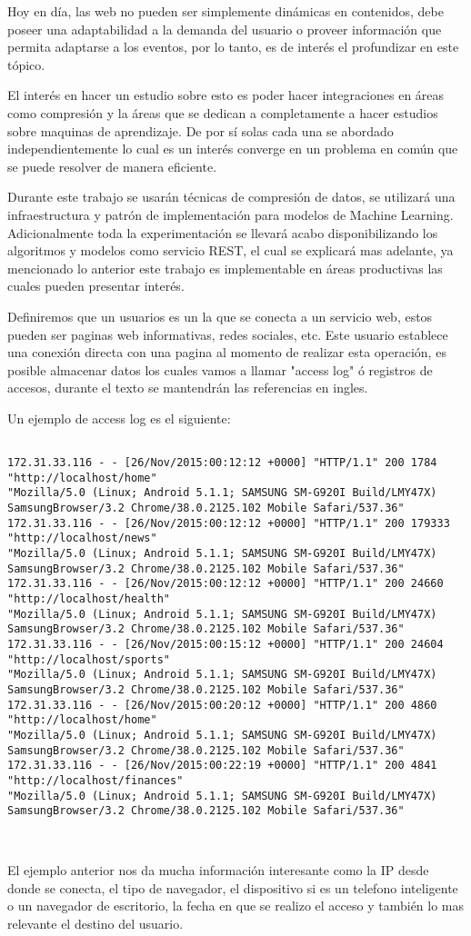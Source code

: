  Hoy en día, las web no pueden ser simplemente dinámicas en contenidos, debe poseer una adaptabilidad a la demanda del usuario o proveer información que permita adaptarse a los eventos, por lo tanto, es de interés el profundizar en este tópico.

  El interés en hacer un estudio sobre esto es poder hacer integraciones en áreas como compresión y la áreas que se dedican a completamente a hacer estudios sobre maquinas de aprendizaje. De por sí solas cada una se abordado independientemente lo cual es un interés converge en un problema en común que se puede resolver de manera eficiente.

  Durante este trabajo se usarán técnicas de compresión de datos, se utilizará una infraestructura y patrón de implementación para modelos de Machine Learning. Adicionalmente toda la experimentación se llevará acabo disponibilizando los algoritmos y modelos como servicio REST, el cual se explicará mas adelante, ya mencionado lo anterior este trabajo es implementable en áreas productivas las cuales pueden presentar interés.

  Definiremos que un usuarios es un la que se conecta a un servicio web, estos pueden ser paginas web informativas, redes sociales, etc. Este usuario establece una conexión directa con una pagina al momento de realizar esta operación, es posible almacenar datos los cuales vamos a llamar "access log" ó registros de accesos, durante el texto se mantendrán las referencias en ingles.

  Un ejemplo de access log es el siguiente:


\begin{lstlisting}[frame=single,basicstyle=\ttfamily\tiny,]

172.31.33.116 - - [26/Nov/2015:00:12:12 +0000] "HTTP/1.1" 200 1784 "http://localhost/home" 
"Mozilla/5.0 (Linux; Android 5.1.1; SAMSUNG SM-G920I Build/LMY47X) 
SamsungBrowser/3.2 Chrome/38.0.2125.102 Mobile Safari/537.36"
172.31.33.116 - - [26/Nov/2015:00:12:12 +0000] "HTTP/1.1" 200 179333 "http://localhost/news" 
"Mozilla/5.0 (Linux; Android 5.1.1; SAMSUNG SM-G920I Build/LMY47X) 
SamsungBrowser/3.2 Chrome/38.0.2125.102 Mobile Safari/537.36"
172.31.33.116 - - [26/Nov/2015:00:12:12 +0000] "HTTP/1.1" 200 24660 "http://localhost/health" 
"Mozilla/5.0 (Linux; Android 5.1.1; SAMSUNG SM-G920I Build/LMY47X) 
SamsungBrowser/3.2 Chrome/38.0.2125.102 Mobile Safari/537.36"
172.31.33.116 - - [26/Nov/2015:00:15:12 +0000] "HTTP/1.1" 200 24604 "http://localhost/sports" 
"Mozilla/5.0 (Linux; Android 5.1.1; SAMSUNG SM-G920I Build/LMY47X) 
SamsungBrowser/3.2 Chrome/38.0.2125.102 Mobile Safari/537.36"
172.31.33.116 - - [26/Nov/2015:00:20:12 +0000] "HTTP/1.1" 200 4860 "http://localhost/home" 
"Mozilla/5.0 (Linux; Android 5.1.1; SAMSUNG SM-G920I Build/LMY47X) 
SamsungBrowser/3.2 Chrome/38.0.2125.102 Mobile Safari/537.36"
172.31.33.116 - - [26/Nov/2015:00:22:19 +0000] "HTTP/1.1" 200 4841 "http://localhost/finances" 
"Mozilla/5.0 (Linux; Android 5.1.1; SAMSUNG SM-G920I Build/LMY47X) 
SamsungBrowser/3.2 Chrome/38.0.2125.102 Mobile Safari/537.36"

  	
  \end{lstlisting}

  El ejemplo anterior nos da mucha información interesante como la IP desde donde se conecta, el tipo de navegador, el dispositivo si es un telefono inteligente o un navegador de escritorio, la fecha en que se realizo el acceso y también lo mas relevante el destino del usuario.